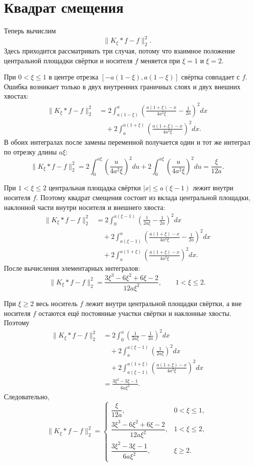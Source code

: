 \section*{Квадрат смещения}

Теперь вычислим
\[
\|K_\xi*f-f\|_2^2.
\]
Здесь приходится рассматривать три случая, потому что взаимное положение
центральной площадки свёртки и носителя $f$ меняется при $\xi=1$ и
$\xi=2$.

При $0<\xi\le 1$ в центре отрезка $[-a(1-\xi),a(1-\xi)]$ свёртка совпадает
с $f$. Ошибка возникает только в двух внутренних граничных слоях и двух
внешних хвостах:
\[
\begin{aligned}
\|K_\xi*f-f\|_2^2
&=2\int_{a(1-\xi)}^{a}
\left(
\frac{a(1+\xi)-x}{4a^2\xi}-\frac{1}{2a}
\right)^2 dx\\
&\quad
+2\int_{a}^{a(1+\xi)}
\left(\frac{a(1+\xi)-x}{4a^2\xi}\right)^2 dx.
\end{aligned}
\]
В обоих интегралах после замены переменной получается один и тот же
интеграл по отрезку длины $a\xi$:
\[
\|K_\xi*f-f\|_2^2
=2\int_0^{a\xi}\left(\frac{u}{4a^2\xi}\right)^2du
+2\int_0^{a\xi}\left(\frac{u}{4a^2\xi}\right)^2du
=\frac{\xi}{12a}.
\]

При $1<\xi\le 2$ центральная площадка свёртки
$|x|\le a(\xi-1)$ лежит внутри носителя $f$. Поэтому квадрат смещения
состоит из вклада центральной площадки, наклонной части внутри носителя и
внешнего хвоста:
\[
\begin{aligned}
\|K_\xi*f-f\|_2^2
&=2\int_0^{a(\xi-1)}
\left(\frac{1}{2a\xi}-\frac{1}{2a}\right)^2dx\\
&\quad
+2\int_{a(\xi-1)}^{a}
\left(
\frac{a(1+\xi)-x}{4a^2\xi}-\frac{1}{2a}
\right)^2dx\\
&\quad
+2\int_a^{a(1+\xi)}
\left(\frac{a(1+\xi)-x}{4a^2\xi}\right)^2dx.
\end{aligned}
\]
После вычисления элементарных интегралов:
\[
\|K_\xi*f-f\|_2^2
=\frac{3\xi^3-6\xi^2+6\xi-2}{12a\xi^2},
\qquad 1<\xi\le 2.
\]

При $\xi\ge 2$ весь носитель $f$ лежит внутри центральной площадки
свёртки, а вне носителя $f$ остаются ещё постоянные участки свёртки и
наклонные хвосты. Поэтому
\[
\begin{aligned}
\|K_\xi*f-f\|_2^2
&=2\int_0^a
\left(\frac{1}{2a\xi}-\frac{1}{2a}\right)^2dx\\
&\quad
+2\int_a^{a(\xi-1)}
\left(\frac{1}{2a\xi}\right)^2dx\\
&\quad
+2\int_{a(\xi-1)}^{a(1+\xi)}
\left(\frac{a(1+\xi)-x}{4a^2\xi}\right)^2dx\\
&=\frac{3\xi^2-3\xi-1}{6a\xi^2}.
\end{aligned}
\]
Следовательно,
\[
\|K_\xi*f-f\|_2^2=
\begin{cases}
\dfrac{\xi}{12a}, & 0<\xi\le 1,\\[6pt]
\dfrac{3\xi^3-6\xi^2+6\xi-2}{12a\xi^2}, & 1<\xi\le 2,\\[6pt]
\dfrac{3\xi^2-3\xi-1}{6a\xi^2}, & \xi\ge 2.
\end{cases}
\]


